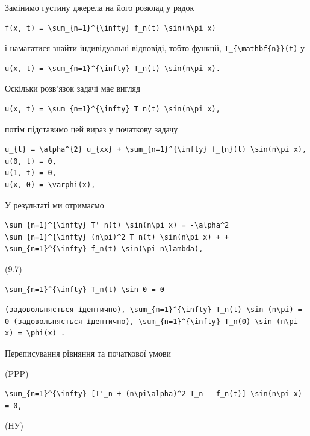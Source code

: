 \documentclass[
  ukrainian,
]{article}
\begin{document}
Замінимо густину джерела на його розклад у рядок

\begin{verbatim}
f(x, t) = \sum_{n=1}^{\infty} f_n(t) \sin(n\pi x)
\end{verbatim}

і намагатися знайти індивідуальні відповіді, тобто функції,
\texttt{T\_\{\textbackslash{}mathbf\{n\}\}(t)} у

\begin{verbatim}
u(x, t) = \sum_{n=1}^{\infty} T_n(t) \sin(n\pi x).
\end{verbatim}

Оскільки розв'язок задачі має вигляд

\begin{verbatim}
u(x, t) = \sum_{n=1}^{\infty} T_n(t) \sin(n\pi x),
\end{verbatim}

потім підставимо цей вираз у початкову задачу

\begin{verbatim}
u_{t} = \alpha^{2} u_{xx} + \sum_{n=1}^{\infty} f_{n}(t) \sin(n\pi x),
u(0, t) = 0,
u(1, t) = 0,
u(x, 0) = \varphi(x),
\end{verbatim}

У результаті ми отримаємо

\begin{verbatim}
\sum_{n=1}^{\infty} T'_n(t) \sin(n\pi x) = -\alpha^2 \sum_{n=1}^{\infty} (n\pi)^2 T_n(t) \sin(n\pi x) + + \sum_{n=1}^{\infty} f_n(t) \sin(\pi n\lambda),
\end{verbatim}

(9.7)

\begin{verbatim}
\sum_{n=1}^{\infty} T_n(t) \sin 0 = 0
\end{verbatim}

\begin{verbatim}
(задовольняється ідентично), \sum_{n=1}^{\infty} T_n(t) \sin (n\pi) = 0 (задовольняється ідентично), \sum_{n=1}^{\infty} T_n(0) \sin (n\pi x) = \phi(x) .
\end{verbatim}

Переписування рівняння та початкової умови

(PPP)

\begin{verbatim}
\sum_{n=1}^{\infty} [T'_n + (n\pi\alpha)^2 T_n - f_n(t)] \sin(n\pi x) = 0,
\end{verbatim}

(НУ)
\end{document}
